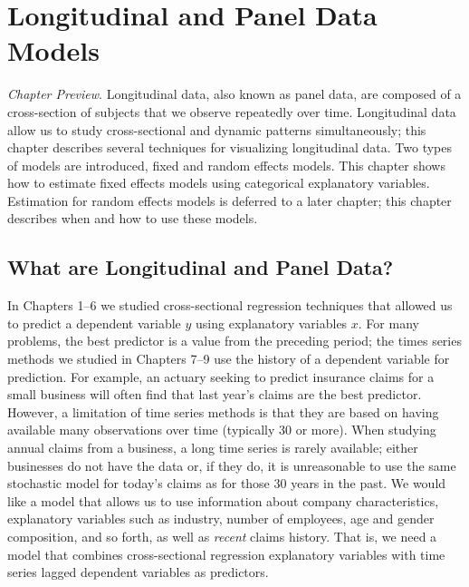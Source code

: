 
\setcounter{chapter}{9}
\chapter{Longitudinal and Panel Data Models}

{\small \textit{Chapter Preview}. Longitudinal data, also known as
panel data, are composed of a cross-section of subjects that we
observe repeatedly over time. Longitudinal data allow us to study
cross-sectional and dynamic patterns simultaneously; this chapter
describes several techniques for visualizing longitudinal data. Two
types of models are introduced, fixed and random effects models.
This chapter shows how to estimate fixed effects models using
categorical explanatory variables. Estimation for random effects
models is deferred to a later chapter; this chapter describes when
and how to use these models.}

\section{What are Longitudinal and Panel Data?}\label{S10:Intro}

In Chapters 1--6 we studied cross-sectional regression techniques
that allowed us to predict a dependent variable $y$ using
explanatory variables $x$. For many problems, the best predictor is
a value from the preceding period; the times series methods we
studied in Chapters 7--9 use the history of a dependent variable for
prediction. For example, an actuary seeking to predict insurance
claims for a small business will often find that last year's claims
are the best predictor. However, a limitation of time series methods
is that they are based on having available many observations over
time (typically 30 or more). When studying annual claims from a
business, a long time series is rarely available; either businesses
do not have the data or, if they do, it is unreasonable to use the
same stochastic model for today's claims as for those 30 years in
the past. We would like a model that allows us to use information
about company characteristics, explanatory variables such as
industry, number of employees, age and gender composition, and so
forth, as well as \emph{recent} claims history. That is, we need a
model that combines cross-sectional regression explanatory variables
with time series lagged dependent variables as predictors.

